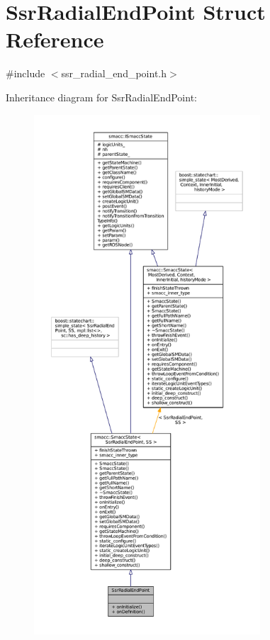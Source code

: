 \hypertarget{structSsrRadialEndPoint}{}\section{Ssr\+Radial\+End\+Point Struct Reference}
\label{structSsrRadialEndPoint}


{\ttfamily \#include $<$ssr\+\_\+radial\+\_\+end\+\_\+point.\+h$>$}



Inheritance diagram for Ssr\+Radial\+End\+Point\+:
\nopagebreak
\begin{figure}[H]
\begin{center}
\leavevmode
\includegraphics[height=550pt]{structSsrRadialEndPoint__inherit__graph}
\end{center}
\end{figure}


